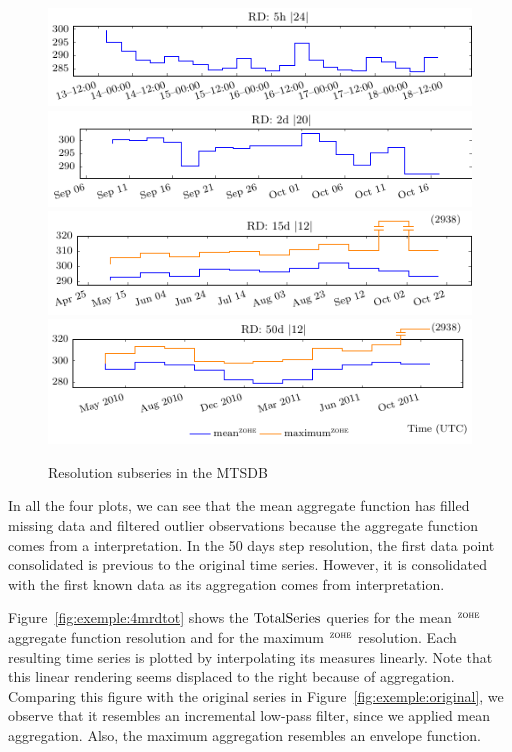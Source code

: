 \begin{figure}[tp]
  \centering
  \includegraphics{fig_exemple_4mrd1.pdf}
  \includegraphics{fig_exemple_4mrd2.pdf}
  \includegraphics{fig_exemple_4mrd3.pdf}
  \includegraphics{fig_exemple_4mrd4.pdf}
  \caption{Resolution subseries in the MTSDB}
  \label{fig:exemple:4mrd}
\end{figure}

In all the four plots, we can see that the mean aggregate function has
filled missing data and filtered outlier observations because the
aggregate function comes from a \zohe{} interpretation.  In the 50
days step resolution, the first data point consolidated is previous to
the original time series. However, it is consolidated with the first
known data as its aggregation comes from \zohe{} interpretation.

Figure~\ref{fig:exemple:4mrdtot} shows the $\operatorname{TotalSeries}$ queries for
the mean $^{\zohe}$ aggregate function resolution and for the maximum
$^{\zohe}$ resolution.  Each resulting time series is plotted by
interpolating its measures linearly. Note that this linear rendering
seems displaced to the right because of \zohe{} aggregation.
Comparing this figure with the original series in
Figure~\ref{fig:exemple:original}, we observe that it resembles an
incremental low-pass filter, since we applied mean aggregation. Also,
the maximum aggregation resembles an envelope function.

